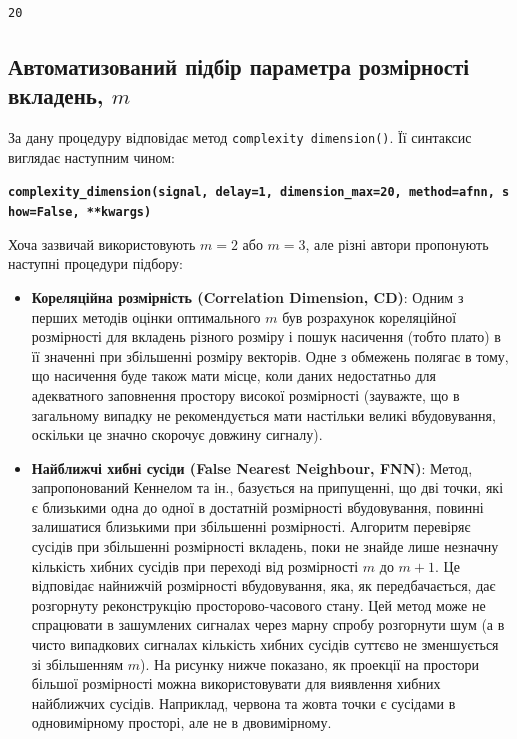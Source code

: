 \documentclass[
  letterpaper,
]{report}
\providecommand{\tightlist}{%
  \setlength{\itemsep}{0pt}\setlength{\parskip}{0pt}}\usepackage{longtable,booktabs,array}
\begin{document}
\begin{verbatim}
20
\end{verbatim}

\hypertarget{ux430ux432ux442ux43eux43cux430ux442ux438ux437ux43eux432ux430ux43dux438ux439-ux43fux456ux434ux431ux456ux440-ux43fux430ux440ux430ux43cux435ux442ux440ux430-ux440ux43eux437ux43cux456ux440ux43dux43eux441ux442ux456-ux432ux43aux43bux430ux434ux435ux43dux44c-m}{%
\subsection{\texorpdfstring{Автоматизований підбір параметра розмірності
вкладень,
\(m\)}{Автоматизований підбір параметра розмірності вкладень, m}}\label{ux430ux432ux442ux43eux43cux430ux442ux438ux437ux43eux432ux430ux43dux438ux439-ux43fux456ux434ux431ux456ux440-ux43fux430ux440ux430ux43cux435ux442ux440ux430-ux440ux43eux437ux43cux456ux440ux43dux43eux441ux442ux456-ux432ux43aux43bux430ux434ux435ux43dux44c-m}}

За дану процедуру відповідає метод \texttt{complexity\ dimension()}. Її
синтаксис виглядає наступним чином:

\textbf{\texttt{complexity\_dimension(signal,\ delay=1,\ dimension\_max=20,\ method=\textquotesingle{}afnn\textquotesingle{},\ show=False,\ **kwargs)}}

Хоча зазвичай використовують \(m=2\) або \(m=3\), але різні автори
пропонують наступні процедури підбору:

\begin{itemize}
\tightlist
\item
  \textbf{Кореляційна розмірність (Correlation Dimension, CD)}: Одним з
  перших методів оцінки оптимального \(m\) був розрахунок кореляційної
  розмірності для вкладень різного розміру і пошук насичення (тобто
  плато) в її значенні при збільшенні розміру векторів. Одне з обмежень
  полягає в тому, що насичення буде також мати місце, коли даних
  недостатньо для адекватного заповнення простору високої розмірності
  (зауважте, що в загальному випадку не рекомендується мати настільки
  великі вбудовування, оскільки це значно скорочує довжину сигналу).
\item
  \textbf{Найближчі хибні сусіди (False Nearest Neighbour, FNN)}: Метод,
  запропонований Кеннелом та ін., базується на припущенні, що дві точки,
  які є близькими одна до одної в достатній розмірності вбудовування,
  повинні залишатися близькими при збільшенні розмірності. Алгоритм
  перевіряє сусідів при збільшенні розмірності вкладень, поки не знайде
  лише незначну кількість хибних сусідів при переході від розмірності
  \(m\) до \(m+1\). Це відповідає найнижчій розмірності вбудовування,
  яка, як передбачається, дає розгорнуту реконструкцію
  просторово-часового стану. Цей метод може не спрацювати в зашумлених
  сигналах через марну спробу розгорнути шум (а в чисто випадкових
  сигналах кількість хибних сусідів суттєво не зменшується зі
  збільшенням \(m\)). На рисунку нижче показано, як проекції на простори
  більшої розмірності можна використовувати для виявлення хибних
  найближчих сусідів. Наприклад, червона та жовта точки є сусідами в
  одновимірному просторі, але не в двовимірному.
\end{itemize}
\end{document}
